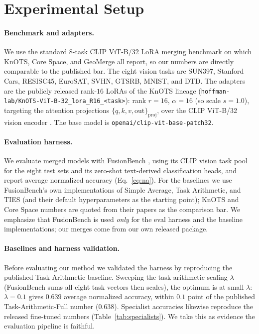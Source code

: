 \documentclass[11pt]{article}
\begin{document}
\section{Experimental Setup}
\label{sec:setup}

\paragraph{Benchmark and adapters.}
We use the standard $8$-task CLIP ViT-B/32 LoRA merging benchmark on which KnOTS, Core Space, and
GeoMerge all report, so our numbers are directly comparable to the published bar. The eight vision tasks
are SUN397, Stanford Cars, RESISC45, EuroSAT, SVHN, GTSRB, MNIST, and DTD. The adapters are the publicly
released rank-$16$ LoRAs of the KnOTS lineage (\texttt{hoffman-lab/KnOTS-ViT-B-32\_lora\_R16\_<task>}):
rank $r=16$, $\alpha=16$ (so scale $s=1.0$), targeting the attention projections
$\{q,k,v,\text{out}\}_{\text{proj}}$, over the CLIP ViT-B/32 vision encoder
\citep{radford2021clip}. The base model is \texttt{openai/clip-vit-base-patch32}.

\paragraph{Evaluation harness.}
We evaluate merged models with FusionBench \citep{tang2024fusionbench}, using its CLIP vision task pool
for the eight test sets and its zero-shot text-derived classification heads, and report average
normalized accuracy (Eq.~\eqref{eq:na}). For the baselines we use FusionBench's own implementations of
Simple Average, Task Arithmetic, and TIES (and their default hyperparameters as the starting point);
KnOTS and Core Space numbers are quoted from their papers as the comparison bar. We emphasize that
FusionBench is used \emph{only} for the eval harness and the baseline implementations; our merges come
from our own released package.

\paragraph{Baselines and harness validation.}
Before evaluating our method we validated the harness by reproducing the published Task Arithmetic
baseline. Sweeping the task-arithmetic scaling $\lambda$ (FusionBench sums all eight task vectors then
scales), the optimum is at small $\lambda$: $\lambda=0.1$ gives $0.639$ average normalized accuracy,
within $0.1$ point of the published Task-Arithmetic-Full number ($0.638$). Specialist accuracies likewise
reproduce the released fine-tuned numbers (Table~\ref{tab:specialists}). We take this as evidence the
evaluation pipeline is faithful.
\end{document}
